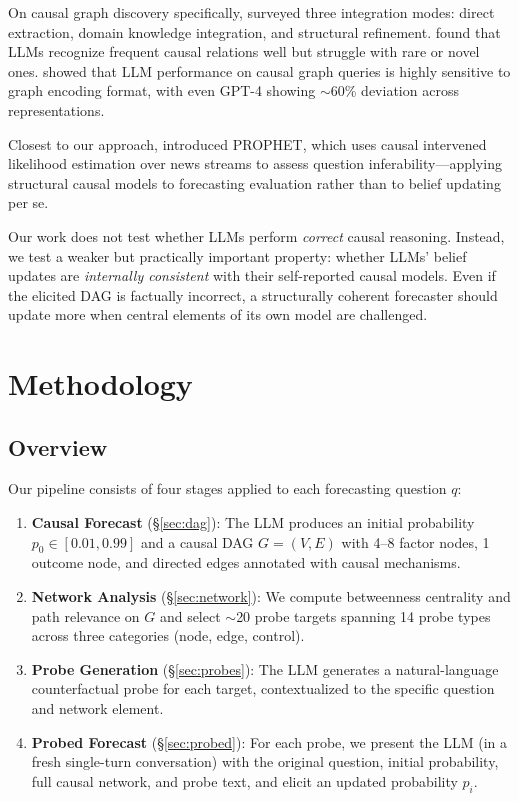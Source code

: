 \documentclass[11pt]{article}
\begin{document}
On causal graph discovery specifically, \citet{wan2024causal} surveyed three integration modes: direct extraction, domain knowledge integration, and structural refinement. \citet{feng2025reliability} found that LLMs recognize frequent causal relations well but struggle with rare or novel ones. \citet{sheth2024causalgraph2llm} showed that LLM performance on causal graph queries is highly sensitive to graph encoding format, with even GPT-4 showing $\sim$60\% deviation across representations.

Closest to our approach, \citet{tao2025prophet} introduced PROPHET, which uses causal intervened likelihood estimation over news streams to assess question inferability---applying structural causal models to forecasting evaluation rather than to belief updating per se.

Our work does not test whether LLMs perform \textit{correct} causal reasoning. Instead, we test a weaker but practically important property: whether LLMs' belief updates are \textit{internally consistent} with their self-reported causal models. Even if the elicited DAG is factually incorrect, a structurally coherent forecaster should update more when central elements of its own model are challenged.

\section{Methodology}
\label{sec:method}

\subsection{Overview}

Our pipeline consists of four stages applied to each forecasting question $q$:

\begin{enumerate}
    \item \textbf{Causal Forecast} (\S\ref{sec:dag}): The LLM produces an initial probability $p_0 \in [0.01, 0.99]$ and a causal DAG $G = (V, E)$ with 4--8 factor nodes, 1 outcome node, and directed edges annotated with causal mechanisms.
    \item \textbf{Network Analysis} (\S\ref{sec:network}): We compute betweenness centrality and path relevance on $G$ and select ${\sim}$20 probe targets spanning 14 probe types across three categories (node, edge, control).
    \item \textbf{Probe Generation} (\S\ref{sec:probes}): The LLM generates a natural-language counterfactual probe for each target, contextualized to the specific question and network element.
    \item \textbf{Probed Forecast} (\S\ref{sec:probed}): For each probe, we present the LLM (in a fresh single-turn conversation) with the original question, initial probability, full causal network, and probe text, and elicit an updated probability $p_i$.
\end{enumerate}
\end{document}
